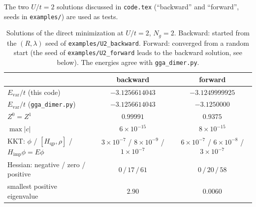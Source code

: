 \documentclass[11pt]{article}
\newcommand{\Ng}{N_{g}}
\newcommand{\Hqp}{H_{\mathrm{qp}}}
\newcommand{\Himp}{H_{\mathrm{imp}}}
\begin{document}
The two $U/t=2$ solutions discussed in \texttt{code.tex} (``backward'' and ``forward'', seeds
in \texttt{examples/}) are used as tests.
\begin{table}[H]
\centering
\small
\begin{tabular}{lcc}
\toprule
 & backward & forward \\
\midrule
$E_{\mathrm{var}}/t$ (this code) & $-3.1256614043$ & $-3.1249999925$ \\
$E_{\mathrm{var}}/t$ (\texttt{gga\_dimer.py}) & $-3.1256614043$ & $-3.1250000$ \\
$Z^0=Z^1$ & $0.99991$ & $0.9375$ \\
$\max|c|$ & $6\times10^{-15}$ & $8\times10^{-15}$ \\
KKT: $\phi$ / $[\Hqp,\rho]$ / $\Himp\phi=E\phi$ & $3\!\times\!10^{-7}$ / $8\!\times\!10^{-9}$ / $1\!\times\!10^{-7}$ &
   $6\!\times\!10^{-7}$ / $6\!\times\!10^{-8}$ / $3\!\times\!10^{-7}$ \\
Hessian: negative / zero / positive & $0\,/\,17\,/\,61$ & $0\,/\,20\,/\,58$ \\
smallest positive eigenvalue & $2.90$ & $0.0060$ \\
\bottomrule
\end{tabular}
\caption{Solutions of the direct minimization at $U/t=2$, $\Ng=2$. Backward: started from the
$(R,\lambda)$ seed of \texttt{examples/U2\_backward}. Forward: converged from a random start (the
seed of \texttt{examples/U2\_forward} leads to the backward solution, see below). The energies agree with
\texttt{gga\_dimer.py}.}
\label{tab:ni}
\end{table}
\end{document}
